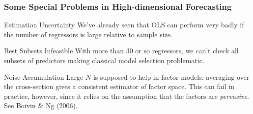 \begin{frame}[c]\frametitle{Some Special Problems in High-dimensional Forecasting}
    

\begin{block}
	{Estimation Uncertainty} 
	We've already seen that OLS can perform very badly if the number of regressors is large relative to sample size.
\end{block}

\begin{block}
	{Best Subsets Infeasible}
	With more than 30 or so regressors, we can't check all subsets of predictors making classical model selection problematic.
\end{block}

\begin{block}
	{Noise Accumulation} 
	Large $N$ is supposed to help in factor models: averaging over the cross-section gives a consistent estimator of factor space. This can fail in practice, however, since it relies on the assumption that the factors are \emph{pervasive}. See Boivin \& Ng (2006).
\end{block}


\end{frame}
